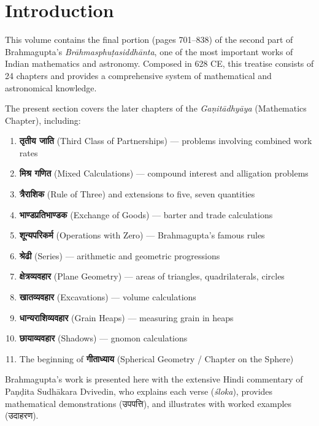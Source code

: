 \documentclass[11pt,a4paper]{article}
\newcommand{\dev}[1]{{\devanagarifont #1}}
\begin{document}
\section*{Introduction}

This volume contains the final portion (pages 701–838) of the second part of Brahmagupta's \textit{Brāhmasphuṭasiddhānta}, one of the most important works of Indian mathematics and astronomy. Composed in 628 CE, this treatise consists of 24 chapters and provides a comprehensive system of mathematical and astronomical knowledge.

The present section covers the later chapters of the \textit{Gaṇitādhyāya} (Mathematics Chapter), including:

\begin{enumerate}
    \item \textbf{\dev{तृतीय जाति}} (Third Class of Partnerships) — problems involving combined work rates
    \item \textbf{\dev{मिश्र गणित}} (Mixed Calculations) — compound interest and alligation problems
    \item \textbf{\dev{त्रैराशिक}} (Rule of Three) and extensions to five, seven quantities
    \item \textbf{\dev{भाण्डप्रतिभाण्डक}} (Exchange of Goods) — barter and trade calculations
    \item \textbf{\dev{शून्यपरिकर्म}} (Operations with Zero) — Brahmagupta's famous rules
    \item \textbf{\dev{श्रेढी}} (Series) — arithmetic and geometric progressions
    \item \textbf{\dev{क्षेत्रव्यवहार}} (Plane Geometry) — areas of triangles, quadrilaterals, circles
    \item \textbf{\dev{खातव्यवहार}} (Excavations) — volume calculations
    \item \textbf{\dev{धान्यराशिव्यवहार}} (Grain Heaps) — measuring grain in heaps
    \item \textbf{\dev{छायाव्यवहार}} (Shadows) — gnomon calculations
    \item The beginning of \textbf{\dev{गीताध्याय}} (Spherical Geometry / Chapter on the Sphere)
\end{enumerate}

Brahmagupta's work is presented here with the extensive Hindi commentary of Paṇḍita Sudhākara Dvivedin, who explains each verse (\textit{śloka}), provides mathematical demonstrations (\dev{उपपत्ति}), and illustrates with worked examples (\dev{उदाहरण}).
\end{document}
